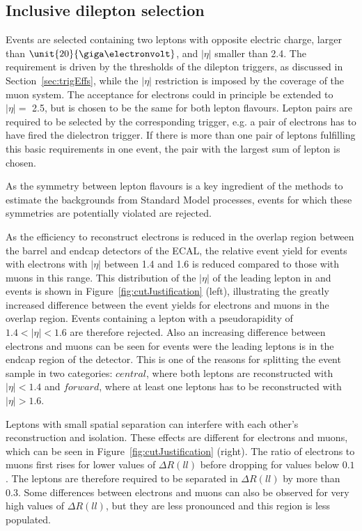 \subsection{Inclusive dilepton selection}
Events are selected containing two leptons with opposite electric charge, \pt larger than $\unit{20}{\giga\electronvolt}$, and $|\eta|$ smaller than 2.4. The \pt requirement is driven by the thresholds of the dilepton triggers, as discussed in Section~\ref{sec:trigEffs}, while the $|\eta|$ restriction is imposed  by the coverage of the muon system. The acceptance for electrons could in principle be extended to $|\eta| =$ 2.5, but is chosen to be the same for both lepton flavours. Lepton pairs are required to be selected by the corresponding trigger, e.g. a pair of electrons has to have fired the dielectron trigger. If there is more than one pair of leptons fulfilling this basic requirements in one event, the pair with the largest sum of lepton \pt is chosen. 

As the symmetry between lepton flavours is a key ingredient of the methods to estimate the backgrounds from Standard Model processes, events for which these symmetries are potentially violated are rejected.

As the efficiency to reconstruct electrons is reduced in the overlap region between the barrel and endcap detectors of the ECAL, the relative event yield for events with electrons with $|\eta|$ between 1.4 and 1.6 is reduced compared to those with muons in this range. This distribution of the $|\eta|$ of the leading lepton in \EE and  \MM events is shown in Figure~\ref{fig:cutJustification} (left), illustrating the greatly increased difference between the event yields for electrons and muons in the overlap region. Events containing a lepton with a pseudorapidity of $1.4<|\eta|<1.6$ are therefore rejected. Also an increasing difference between electrons and muons can be seen for events were the leading leptons is in the endcap region of the detector. This is one of the reasons for splitting the event sample in two categories: $\textit{central}$, where both leptons are reconstructed with $|\eta| < 1.4$ and $\textit{forward}$, where at least one leptons has to be reconstructed with $|\eta| > 1.6$.  

Leptons with small spatial separation can interfere with each other's reconstruction and isolation. These effects are different for electrons and muons, which can be seen in Figure~\ref{fig:cutJustification} (right). The ratio of electrons to muons first rises for lower values of $\Delta R(ll)$ before dropping for values below $0.1$. The leptons are therefore required to be separated in $\Delta R(ll)$ by more than 0.3. Some differences between electrons and muons can also be observed for very high values of $\Delta R(ll)$, but they are less pronounced and this region is less populated.  


